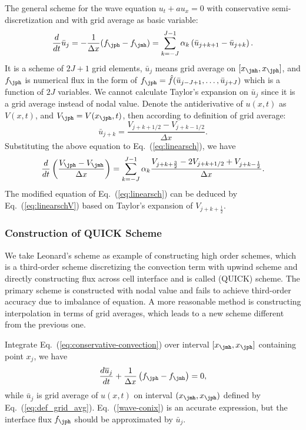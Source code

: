 \documentclass[]{article}
\begin{document}
The general scheme for the wave equation $u_t+a u_x=0$ with
conservative semi-discretization and with grid average as basic variable:
\begin{equation}
  \frac{d}{dt}\bar u_j = -\frac{1}{\Delta x}(f_{\jph}-f_{\jmh})=\sum_{k=-J}^{J-1}\alpha_k\left(\bar u_{j+k+1}-\bar u_{j+k}\right).
  \label{eq:linearsch}
\end{equation}
It is a scheme of $2J+1$ grid elements, $\bar u_j$ means grid
average on $[x_{\jmh}, x_\jph]$, and $f_\jph$ is numerical flux in the
form of $f_{\jph} = \hat f(\bar u_{j-J+1},\ldots,\bar u_{j+J})$ which
is a function of $2J$ variables.
We cannot calculate Taylor's expansion on $\bar u_j$ since it is a
grid average instead of nodal value. Denote the antiderivative of
$u(x,t)$ as $V(x,t)$, and $V_\jph = V(x_\jph,t)$, then according to
definition of grid average:
\begin{equation}
  \bar u_{j+k}=\frac{V_{j+k+1/2}-V_{j+k-1/2}}{\Delta x}.
  \label{eq:ujkV}
\end{equation}
Substituting the above equation to Eq.~(\ref{eq:linearsch}), we have 
\begin{equation}
  \frac{d}{dt}\left(\frac{V_{\jph}-V_{\jmh}}{\Delta x}\right)=\sum_{k=-J}^{J-1}\alpha_k\frac{V_{j+k+\frac{3}{2}}-2V_{j+k+1/2}+V_{j+k-\frac{1}{2}}}{\Delta x}.
  \label{eq:linearschV}
\end{equation}
The modified equation of Eq.~(\ref{eq:linearsch}) can be deduced by
Eq.~(\ref{eq:linearschV}) based on Taylor's expansion of $V_{j+k+\frac 12}$.

\subsubsection{Construction of QUICK Scheme}
\label{sec:construct-quick}

We take Leonard's scheme \cite{leonard1979stable}
as example of constructing high order schemes, which is a third-order scheme
discretizing the convection term with upwind scheme and directly constructing
flux across cell interface and is called (QUICK) scheme.
The primary scheme is constructed with nodal value
and fails to achieve third-order accuracy due to imbalance of equation.
A more reasonable method is constructing interpolation in terms of grid 
averages,
which leads to a new scheme different from the previous one.

Integrate Eq.~(\ref{eq:conservative-convection}) over 
interval $[x_\jmh, x_\jph]$ containing point $x_j$, we have
\begin{equation}
  \frac{d \overline{u}_j}{d t}+\frac{1}{\Delta x}\left(f_{\jph}-f_{\jmh}\right)=0,
  \label{wave-conix}
\end{equation}
while $\bar u_j$ is grid average of $u(x,t)$ on interval $(x_\jmh,x_\jph)$
defined by Eq.~(\ref{eq:def_grid_avg}). Eq.~(\ref{wave-conix}) is an accurate
expression, but the interface flux $f_\jph$ should be approximated by $\bar
u_j$. 
\end{document}
